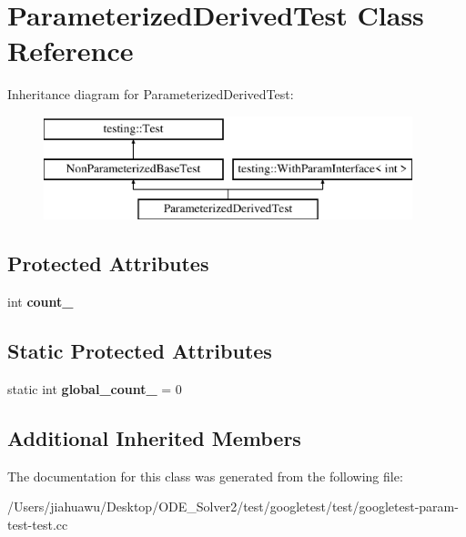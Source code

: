 \hypertarget{class_parameterized_derived_test}{}\section{Parameterized\+Derived\+Test Class Reference}
\label{class_parameterized_derived_test}
Inheritance diagram for Parameterized\+Derived\+Test\+:\begin{figure}[H]
\begin{center}
\leavevmode
\includegraphics[height=3.000000cm]{class_parameterized_derived_test}
\end{center}
\end{figure}
\subsection*{Protected Attributes}
\begin{DoxyCompactItemize}
\item 
\mbox{\label{class_parameterized_derived_test_ad8a2968265e7477c13585d17bbd0492c}} 
int {\bfseries count\+\_\+}
\end{DoxyCompactItemize}
\subsection*{Static Protected Attributes}
\begin{DoxyCompactItemize}
\item 
\mbox{\label{class_parameterized_derived_test_ab6c067a099764a9d58b5f2e8ebcb5d0f}} 
static int {\bfseries global\+\_\+count\+\_\+} = 0
\end{DoxyCompactItemize}
\subsection*{Additional Inherited Members}


The documentation for this class was generated from the following file\+:\begin{DoxyCompactItemize}
\item 
/\+Users/jiahuawu/\+Desktop/\+O\+D\+E\+\_\+\+Solver2/test/googletest/test/googletest-\/param-\/test-\/test.\+cc\end{DoxyCompactItemize}
